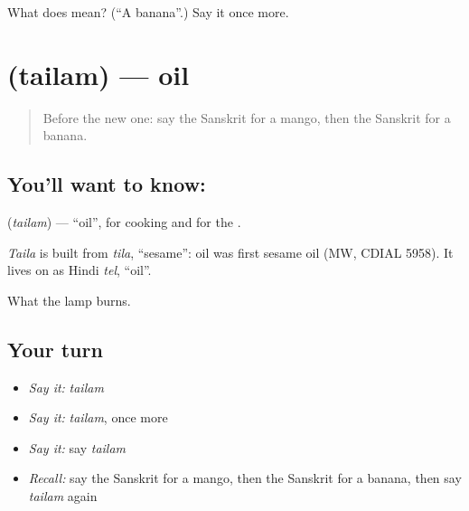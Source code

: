 \begin{tcolorbox}[breakable,colback=teal!4,colframe=teal!35!black,title={Before you move on}]
What does  mean? (\textquotedblleft{}A banana\textquotedblright{}.) Say it once more.
\end{tcolorbox}
\section[\texorpdfstring{\sk{तैलम्} (tailam)}{तैलम् (tailam)}]{ (tailam) — oil}

\label{lesson:SA-C78-oil}



\begin{quote}
Before the new one: say the Sanskrit for a mango, then the Sanskrit for a banana.
\end{quote}

\subsection*{You'll want to know: }
\textbf{} (\emph{tailam}) — \textquotedblleft{}oil\textquotedblright{}, for cooking and for the \textbf{}.

\begin{cousinweb}
\emph{Taila} is built from \emph{tila}, \textquotedblleft{}sesame\textquotedblright{}: oil was first sesame oil (MW, CDIAL 5958). It lives on as Hindi \emph{tel}, \textquotedblleft{}oil\textquotedblright{}.
\end{cousinweb}

\begin{grammarlens}[title={What you've built}]
What the lamp burns.
\end{grammarlens}

\subsection*{Your turn}
\begin{itemize}
\raggedright
  \item \emph{Say it:} \emph{tailam}
  \item \emph{Say it:} \emph{tailam}, once more
  \item \emph{Say it:} say \emph{tailam}
  \item \emph{Recall:} say the Sanskrit for a mango, then the Sanskrit for a banana, then say \emph{tailam} again
\end{itemize}

